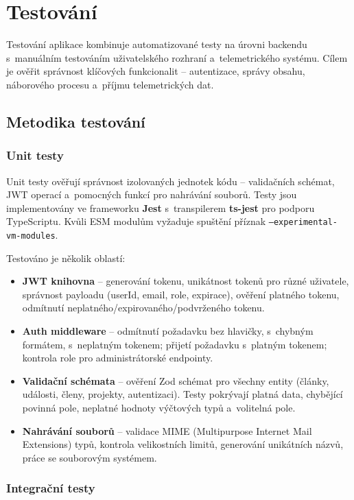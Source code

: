 \chapter{Testování}
\label{chap:testovani}

Testování aplikace kombinuje automatizované testy na úrovni backendu s~manuálním testováním uživatelského rozhraní a~telemetrického systému. Cílem je ověřit správnost klíčových funkcionalit -- autentizace, správy obsahu, náborového procesu a~příjmu telemetrických dat.

\section{Metodika testování}

\subsection{Unit testy}

Unit testy ověřují správnost izolovaných jednotek kódu -- validačních schémat, JWT operací a~pomocných funkcí pro nahrávání souborů. Testy jsou implementovány ve frameworku \textbf{Jest} s~transpilerem \textbf{ts-jest} pro podporu TypeScriptu. Kvůli ESM modulům vyžaduje spuštění příznak \texttt{--experimental-vm-modules}.

Testováno je několik oblastí:

\begin{itemize}
    \item \textbf{JWT knihovna} -- generování tokenu, unikátnost tokenů pro různé uživatele, správnost payloadu (userId, email, role, expirace), ověření platného tokenu, odmítnutí neplatného/expirovaného/podvrženého tokenu.
    \item \textbf{Auth middleware} -- odmítnutí požadavku bez hlavičky, s~chybným formátem, s~neplatným tokenem; přijetí požadavku s~platným tokenem; kontrola role pro administrátorské endpointy.
    \item \textbf{Validační schémata} -- ověření Zod schémat pro všechny entity (články, události, členy, projekty, autentizaci). Testy pokrývají platná data, chybějící povinná pole, neplatné hodnoty výčtových typů a~volitelná pole.
    \item \textbf{Nahrávání souborů} -- validace MIME (Multipurpose Internet Mail Extensions) typů, kontrola velikostních limitů, generování unikátních názvů, práce se souborovým systémem.
\end{itemize}

\subsection{Integrační testy}

